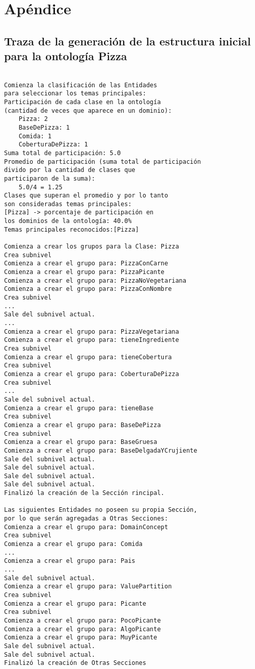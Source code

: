 \chapter*{Apéndice}
\appendix
\renewcommand{\thesection}{A.\arabic{section}}

\section{Traza de la generación de la estructura inicial para la ontología Pizza}
\label{apx:traza_pizza}

\centering
\setlength{\parindent}{1em}
\begin{verbatim}

Comienza la clasificación de las Entidades
para seleccionar los temas principales:
Participación de cada clase en la ontología
(cantidad de veces que aparece en un dominio):
    Pizza: 2
    BaseDePizza: 1
    Comida: 1
    CoberturaDePizza: 1
Suma total de participación: 5.0
Promedio de participación (suma total de participación
divido por la cantidad de clases que 
participaron de la suma):
    5.0/4 = 1.25
Clases que superan el promedio y por lo tanto
son consideradas temas principales:
[Pizza] -> porcentaje de participación en 
los dominios de la ontología: 40.0%
Temas principales reconocidos:[Pizza]

Comienza a crear los grupos para la Clase: Pizza
Crea subnivel
Comienza a crear el grupo para: PizzaConCarne
Comienza a crear el grupo para: PizzaPicante
Comienza a crear el grupo para: PizzaNoVegetariana
Comienza a crear el grupo para: PizzaConNombre
Crea subnivel
...
Sale del subnivel actual.
...
Comienza a crear el grupo para: PizzaVegetariana
Comienza a crear el grupo para: tieneIngrediente
Crea subnivel
Comienza a crear el grupo para: tieneCobertura
Crea subnivel
Comienza a crear el grupo para: CoberturaDePizza
Crea subnivel
...
Sale del subnivel actual.
Comienza a crear el grupo para: tieneBase
Crea subnivel
Comienza a crear el grupo para: BaseDePizza
Crea subnivel
Comienza a crear el grupo para: BaseGruesa
Comienza a crear el grupo para: BaseDelgadaYCrujiente
Sale del subnivel actual.
Sale del subnivel actual.
Sale del subnivel actual.
Sale del subnivel actual.
Finalizó la creación de la Sección rincipal.

Las siguientes Entidades no poseen su propia Sección,
por lo que serán agregadas a Otras Secciones: 
Comienza a crear el grupo para: DomainConcept
Crea subnivel
Comienza a crear el grupo para: Comida
...
Comienza a crear el grupo para: Pais
...
Sale del subnivel actual.
Comienza a crear el grupo para: ValuePartition
Crea subnivel
Comienza a crear el grupo para: Picante
Crea subnivel
Comienza a crear el grupo para: PocoPicante
Comienza a crear el grupo para: AlgoPicante
Comienza a crear el grupo para: MuyPicante
Sale del subnivel actual.
Sale del subnivel actual.
Finalizó la creación de Otras Secciones
\end{verbatim}


